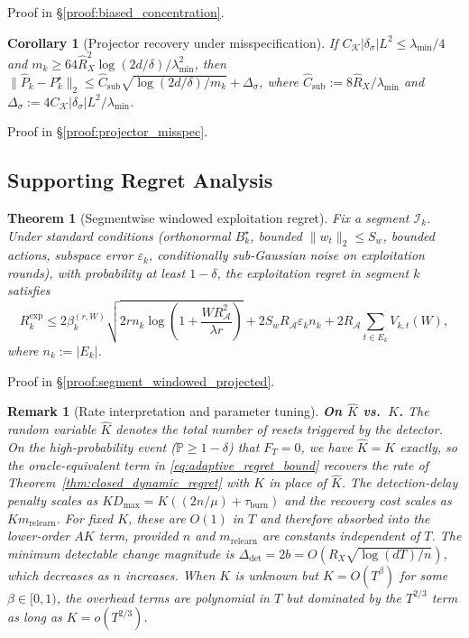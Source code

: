 \documentclass{article}
\newcommand{\Prob}{\mathbb{P}}
\newcommand{\cA}{\mathcal{A}}
\newcommand{\cI}{\mathcal{I}}
\newtheorem{theorem}{Theorem}
\newtheorem{corollary}{Corollary}
\newtheorem{remark}{Remark}
\begin{document}
Proof in \S\ref{proof:biased_concentration}.

\begin{corollary}[Projector recovery under misspecification]
\label{cor:projector_misspec}
If $C_{\mathcal K}|\delta_\sigma|L^2 \le \lambda_{\min}/4$ and $m_k \ge 64\hat R_X^2\log(2d/\delta)/\lambda_{\min}^2$, then
$\|\widehat P_k - P_k^\star\|_2 \le \hat C_{\mathrm{sub}}\sqrt{\log(2d/\delta)/m_k} + \Delta_\sigma$,
where $\hat C_{\mathrm{sub}} := 8\hat R_X/\lambda_{\min}$ and $\Delta_\sigma := 4C_{\mathcal K}|\delta_\sigma|L^2/\lambda_{\min}$.
\end{corollary}

Proof in \S\ref{proof:projector_misspec}.

\subsection{Supporting Regret Analysis}
\label{app:supporting_regret}

\begin{theorem}[Segmentwise windowed exploitation regret]
\label{thm:segment_windowed_projected}
Fix a segment $\cI_k$. Under standard conditions (orthonormal $B_k^\star$, bounded $\|w_t\|_2 \le S_w$, bounded actions, subspace error $\varepsilon_k$, conditionally sub-Gaussian noise on exploitation rounds), with probability at least $1-\delta$, the exploitation regret in segment $k$ satisfies
\[
R_k^{\mathrm{exp}} \le
2\beta_k^{(r,W)}
\sqrt{2r n_k \log\!\left(1+\frac{W R_{\cA}^2}{\lambda r}\right)}
+ 2S_wR_{\cA} \varepsilon_k n_k
+ 2R_{\cA} \sum_{t\in E_k} V_{k,t}(W),
\]
where $n_k:=|E_k|$.
\end{theorem}

Proof in \S\ref{proof:segment_windowed_projected}.

\begin{remark}[Rate interpretation and parameter tuning]
\label{rem:adaptive_rate_discussion}
\textbf{On $\hat K$ vs.\ $K$.}  The random variable $\hat K$ denotes the total number of resets triggered by the detector.  On the high-probability event ($\Prob \ge 1-\delta$) that $F_T = 0$, we have $\hat K = K$ exactly, so the oracle-equivalent term in \eqref{eq:adaptive_regret_bound} recovers the rate of Theorem~\ref{thm:closed_dynamic_regret} with $K$ in place of $\hat K$.  The detection-delay penalty scales as $K D_{\max} = K((2n/\mu) + \tau_{\mathrm{burn}})$ and the recovery cost scales as $K m_{\mathrm{relearn}}$.  For fixed $K$, these are $O(1)$ in $T$ and therefore absorbed into the lower-order $AK$ term, provided $n$ and $m_{\mathrm{relearn}}$ are constants independent of $T$.  The minimum detectable change magnitude is $\Delta_{\mathrm{det}} = 2b = O(R_X\sqrt{\log(dT)/n})$, which decreases as $n$ increases.  When $K$ is unknown but $K = O(T^\beta)$ for some $\beta \in [0, 1)$, the overhead terms are polynomial in $T$ but dominated by the $T^{2/3}$ term as long as $K = o(T^{2/3})$.
\end{remark}
\end{document}
